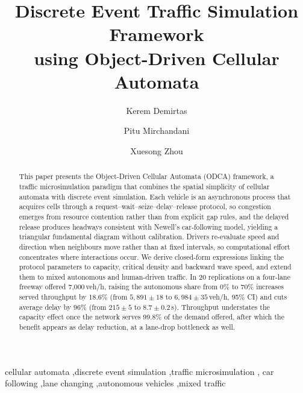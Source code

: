 \documentclass[review,authoryear]{elsarticle}
\begin{document}
\begin{frontmatter}

\title{Discrete Event Traffic Simulation Framework\\using Object-Driven Cellular Automata}

\author[asu]{Kerem Demirtas}
\author[asu]{Pitu Mirchandani}
\author[ssebe]{Xuesong Zhou}


\begin{abstract}
This paper presents the Object-Driven Cellular Automata (ODCA) framework, a traffic microsimulation paradigm that combines the spatial simplicity of cellular automata with discrete event simulation. Each vehicle is an asynchronous process that acquires cells through a request--wait--seize--delay--release protocol, so congestion emerges from resource contention rather than from explicit gap rules, and the delayed release produces headways consistent with Newell's car-following model, yielding a triangular fundamental diagram without calibration. Drivers re-evaluate speed and direction when neighbours move rather than at fixed intervals, so computational effort concentrates where interactions occur. We derive closed-form expressions linking the protocol parameters to capacity, critical density and backward wave speed, and extend them to mixed autonomous and human-driven traffic. In 20 replications on a four-lane freeway offered 7{,}000\,veh/h, raising the autonomous share from 0\% to 70\% increases served throughput by 18.6\% (from $5{,}891 \pm 18$ to $6{,}984 \pm 35$\,veh/h, 95\% CI) and cuts average delay by 96\% (from $215 \pm 5$ to $8.7 \pm 0.2$\,s). Throughput understates the capacity effect once the network serves 99.8\% of the demand offered, after which the benefit appears as delay reduction, at a lane-drop bottleneck as well.
\end{abstract}

\begin{keyword}
cellular automata \sep discrete event simulation \sep traffic microsimulation \sep
car following \sep lane changing \sep autonomous vehicles \sep mixed traffic
\end{keyword}

\end{frontmatter}
\end{document}
